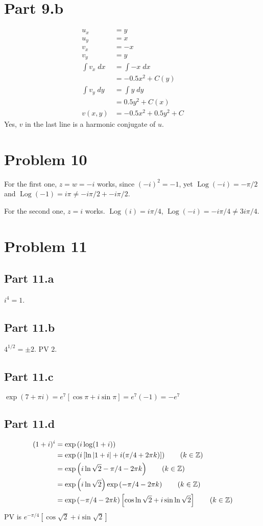\documentclass{article}
\theoremstyle{definition}
\newcommand{\Z}{\mathbb{Z}}
\newcommand{\p}[1]{\left(#1\right)}
\newcommand{\sq}[1]{\left[#1\right]}
\newcommand{\abs}[1]{\left|#1\right|}
\begin{document}
\section{Part 9.b}
\begin{align*}
u_x &= y \\
u_y &= x \\
v_x &= -x \tag{C-R} \\
v_y &= y \tag{C-R} \\
\int v_x \;dx 
&= \int -x \;dx \\
&= -0.5 x^2 +C(y) \\
\int v_y \;dy
&= \int y \;dy \\
&= 0.5 y^2 + C(x) \\
v(x,y) &= -0.5x^2 + 0.5 y^2 + C
\end{align*}
Yes, $v$ in the last line is a harmonic conjugate of $u$.

\section{Problem 10}
For the first one, $z=w=-i$ works, since $(-i)^2=-1$, yet
$\operatorname{Log}(-i) = -\pi/2$ and $\operatorname{Log}(-1) 
= i\pi \neq -i\pi/2 + -i\pi/2$.

For the second one, $z=i$ works. $\operatorname{Log}(i) 
= i\pi/4$, $\operatorname{Log}(-i) = -i\pi/4 \neq 3i\pi/4$.

\section{Problem 11}
\subsection{Part 11.a}
$i^4=1$.
\subsection{Part 11.b}
$4^{1/2} = \pm 2$. PV $2$.
\subsection{Part 11.c}
$\exp(7+\pi i) = e^7 \sq{\cos \pi + i \sin \pi} = e^7(-1) = -e^7$
\subsection{Part 11.d}
\begin{align*}
(1+i)^i 
&= \exp\p{ i \log (1+i) } \\
&= \exp\p{ i \sq{\ln\abs{1+i} + i(\pi/4 + 2\pi k)}} \tag{$k \in \Z$}\\
&= \exp\p{ i \ln\sqrt{2} - \pi/4 - 2\pi k } \tag{$k \in \Z$}\\
&= \exp\p{ i \ln\sqrt{2}} \exp\p{-\pi/4 - 2 \pi k} \tag{$k \in \Z$}\\
&= \exp\p{-\pi/4 - 2 \pi k} \sq{\cos\ln\sqrt{2} + i\sin \ln\sqrt{2}} \tag{$k \in \Z$}\\
\end{align*}
PV is $e^{-\pi/4} \sq{\cos \sqrt{2} + i\sin\sqrt{2}}$
\end{document}
